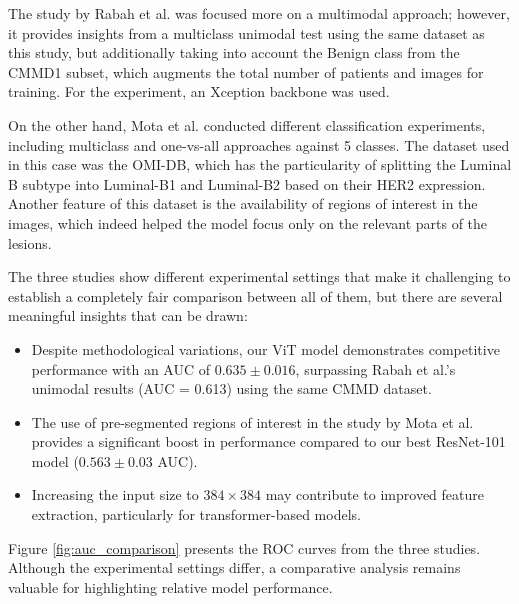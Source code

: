 \documentclass[a4paper,10pt]{book}
\begin{document}
The study by Rabah et al. was focused more on a multimodal approach; however, it provides insights from a multiclass unimodal test using the same dataset as this study, but additionally taking into account the Benign class from the CMMD1 subset, which augments the total number of patients and images for training. For the experiment, an Xception backbone was used. 

On the other hand, Mota et al. conducted different classification experiments, including multiclass and one-vs-all approaches against 5 classes. The dataset used in this case was the OMI-DB, which has the particularity of splitting the Luminal B subtype into Luminal-B1 and Luminal-B2 based on their HER2 expression. Another feature of this dataset is the availability of regions of interest in the images, which indeed helped the model focus only on the relevant parts of the lesions.

The three studies show different experimental settings that make it challenging to establish a completely fair comparison between all of them, but there are several meaningful insights that can be drawn:

\begin{itemize}
\item Despite methodological variations, our ViT model demonstrates competitive performance with an AUC of $0.635 \pm 0.016$, surpassing Rabah et al.'s unimodal results (AUC = 0.613) using the same CMMD dataset.
\item The use of pre-segmented regions of interest in the study by Mota et al. provides a significant boost in performance compared to our best ResNet-101 model ($0.563 \pm 0.03$ AUC).
\item Increasing the input size to $384 \times 384$ may contribute to improved feature extraction, particularly for transformer-based models.
\end{itemize}

Figure \ref{fig:auc_comparison} presents the ROC curves from the three studies. Although the experimental settings differ, a comparative analysis remains valuable for highlighting relative model performance.
\end{document}

